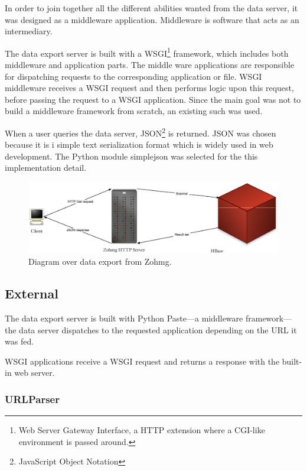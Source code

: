In order to join together all the different abilities wanted from the data
server, it was designed as a middleware application. Middleware is software
that acts as an intermediary.

The data export server is built with a WSGI\footnote{Web Server Gateway
Interface, a HTTP extension where a CGI-like environment is passed around.}
framework, which includes both middleware and application parts. The middle
ware applications are responsible for dispatching requests to the corresponding
application or file. WSGI middleware receives a WSGI request and then performs
logic upon this request, before passing the request to a WSGI application.
\cite{paste,definitive_guide_to_pylons} Since the main goal was not to build a
middleware framework from scratch, an existing such was used.

When a user queries the data server, JSON\footnote{JavaScript Object Notation}
is returned. JSON was chosen because it is i simple text serialization format
which is widely used in web development. The Python module simplejson was
selected for the this implementation detail. \cite{simplejson}


\begin{figure}[h]
    \begin{center}
        \includegraphics[scale=0.35]{gfx/zohmg-export.eps}
        \caption{Diagram over data export from Zohmg.}
    \end{center}
\end{figure}


\subsection*{External}

The data export server is built with Python Paste---a middleware
framework---the data server dispatches to the requested application
depending on the URL it was fed. \cite{paste}

WSGI applications receive a WSGI request and returns a response with the
built-in web server.


\subsubsection{URLParser}

